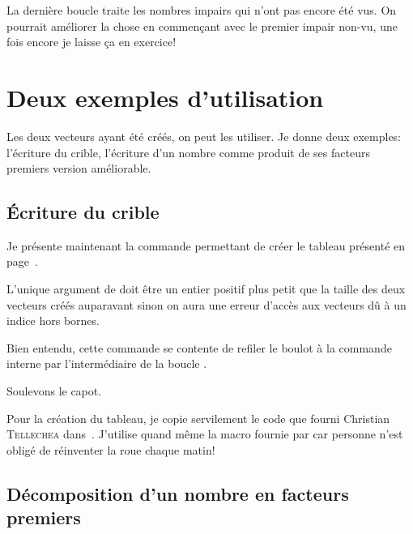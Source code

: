 La dernière boucle traite les nombres impairs qui n'ont pas encore été
vus. On pourrait améliorer la chose en commençant avec le premier
impair non-vu, une fois encore je laisse ça en exercice!  


\section{Deux exemples d'utilisation}
\label{sec:utilisationcrible}

Les deux vecteurs ayant été créés, on peut les utiliser. Je donne deux
exemples: l'écriture du \og crible\fg, l'écriture d'un nombre comme
produit de ses facteurs premiers \TO version améliorable\TF.

\subsection{Écriture du crible}
\label{sec:ecriturecrible}

Je présente maintenant la commande permettant de créer le tableau
présenté en page~\pageref{lecrible100}.


L'unique argument de  doit être un
entier positif plus petit que la taille des deux vecteurs créés
auparavant sinon on aura une erreur d'accès aux vecteurs dû à un
indice hors bornes.

Bien entendu, cette commande se contente de refiler le boulot à la
commande interne  par l'intermédiaire de
la boucle .

Soulevons le capot.


Pour la création du tableau, je copie servilement le code que fourni
Christian \textsc{Tellechea} dans~\autocite{tellechea}. J'utilise
quand même la macro  fournie par \LaTeXe{} car
personne n'est obligé de réinventer la roue chaque matin!

\subsection{Décomposition d'un nombre en facteurs premiers}
\label{sec:facteurspremiers}

